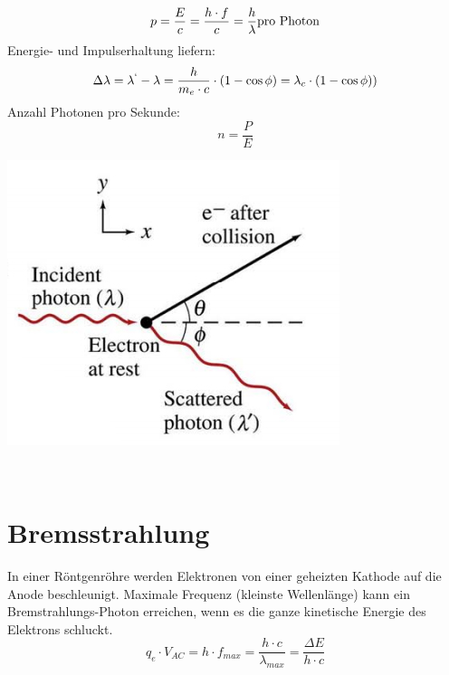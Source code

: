 \[
	p=\frac{E}{c}=\frac{h\cdot f}{c}= \frac{h}{\lambda} \\ \text{pro Photon} \\ \\
\]
Energie- und Impulserhaltung liefern:
\[
	\Delta\lambda = \lambda^` -\lambda=\frac{h}{m_e\cdot c}\cdot \left( 1- \cos \phi  \right) = \lambda_c \cdot \left( 1- \cos \phi   \right) )
\]
Anzahl Photonen pro Sekunde:
\[
	n=\frac{P}{E}
\]
\begin{center}
	\includegraphics[scale = 0.3]{images/impuls_photon.jpg}
\end{center}
\
\section{Bremsstrahlung}
In einer Röntgenröhre werden Elektronen von einer geheizten  Kathode auf die Anode beschleunigt. Maximale Frequenz (kleinste Wellenlänge) kann ein Bremstrahlungs-Photon erreichen, wenn es die ganze kinetische Energie des Elektrons schluckt.\
\[
	q_e\cdot V_{AC} = h\cdot f_{max} = \frac{h\cdot c}{\lambda_{max}}=\frac{\Delta E}{h\cdot c}
\]
\\
